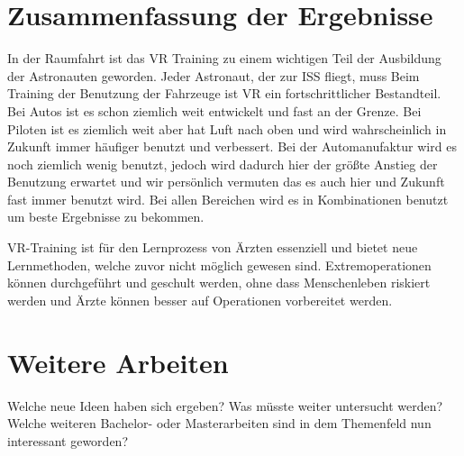 \section{Zusammenfassung der Ergebnisse}
In der Raumfahrt ist das VR Training zu einem wichtigen Teil der Ausbildung der Astronauten geworden. Jeder Astronaut, der zur ISS fliegt, muss
Beim Training der Benutzung der Fahrzeuge ist VR ein fortschrittlicher Bestandteil.
Bei Autos ist es schon ziemlich weit entwickelt und fast an der Grenze. Bei Piloten ist es ziemlich weit aber hat Luft nach oben und wird wahrscheinlich in Zukunft immer häufiger benutzt und verbessert.
Bei der Automanufaktur wird es noch ziemlich wenig benutzt, jedoch wird dadurch hier der größte Anstieg der Benutzung erwartet und wir persönlich vermuten das es auch hier und Zukunft fast immer benutzt wird.
Bei allen Bereichen wird es in Kombinationen benutzt um beste Ergebnisse zu bekommen.

VR-Training ist für den Lernprozess von Ärzten essenziell und bietet neue Lernmethoden, welche zuvor nicht möglich gewesen sind. Extremoperationen können durchgeführt und geschult werden, ohne dass Menschenleben riskiert werden und Ärzte können besser auf Operationen vorbereitet werden.
\section{Weitere Arbeiten}
Welche neue Ideen haben sich ergeben?
Was müsste weiter untersucht werden?
Welche weiteren Bachelor- oder Masterarbeiten sind in dem Themenfeld nun interessant geworden?
